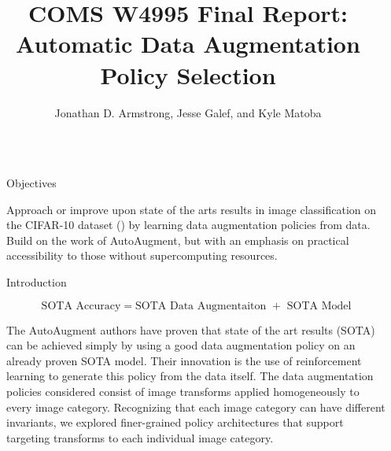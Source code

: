 \documentclass[final]{beamer}
\title{COMS W4995 Final Report: Automatic Data Augmentation Policy Selection} %
\author{Jonathan D. Armstrong, Jesse Galef, and Kyle Matoba} %
\institute{Computer Science Department, Columbia University} %
\newlength{\sepwid}
\newlength{\onecolwid}
\begin{document}
\setlength{\belowcaptionskip}{2ex} %
\setlength\belowdisplayshortskip{2ex} %

\begin{frame}[t] %
\begin{columns}[t] %

\begin{column}{\sepwid} \end{column} %
\begin{column}{\onecolwid} %

\begin{alertblock}{Objectives}
  	
	
  Approach or improve upon state of the arts results in image classification on the CIFAR-10 dataset (\cite{Krizhevsky2009}) by learning data augmentation policies from data. Build on the work of AutoAugment\cite{Cubuk2018}, but with an emphasis on practical accessibility to those without supercomputing resources.
\end{alertblock}


\begin{block}{Introduction}

	\begin{equation}
		\text{SOTA Accuracy} = \text{SOTA Data Augmentaiton } + \text{ SOTA Model}
	\end{equation}

  The AutoAugment authors have proven that state of the art results (SOTA) can be achieved simply by using a good data augmentation policy on an already proven SOTA model. Their innovation is the use of reinforcement learning to generate this policy from the data itself. The data augmentation policies considered consist of image transforms applied homogeneously to every image category. Recognizing that each image category can have different invariants, we explored finer-grained policy architectures that support targeting transforms to each individual image category.


\end{block}
\end{column}
\end{columns}
\end{frame}
\end{document}
